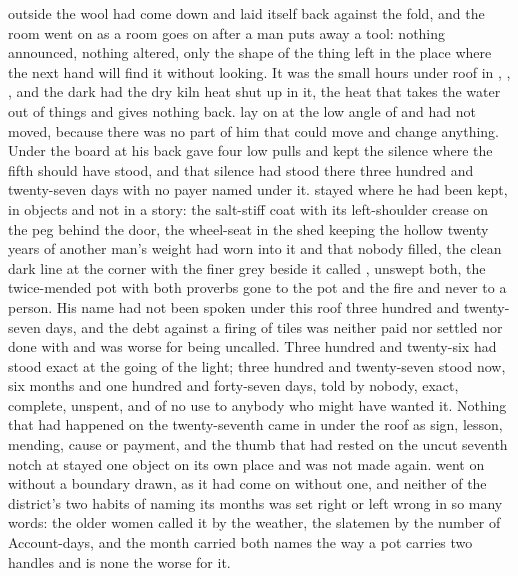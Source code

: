 
 outside the wool had come down and laid itself back against the fold, and the room went on as a room goes on after a man puts away a tool: nothing announced, nothing altered, only the shape of the thing left in the place where the next hand will find it without looking. It was the small hours under  roof in , , , and the dark had the dry kiln heat shut up in it, the heat that takes the water out of things and gives nothing back.  lay on  at the low angle of  and had not moved, because there was no part of him that could move and change anything. Under the board at his back  gave four low pulls and kept the silence where the fifth should have stood, and that silence had stood there three hundred and twenty-seven days with no payer named under it.  stayed where he had been kept, in objects and not in a story: the salt-stiff coat with its left-shoulder crease on the peg behind the door, the wheel-seat in the shed keeping the hollow twenty years of another man's weight had worn into it and that nobody filled, the clean dark line at the corner with the finer grey beside it called , unswept both, the twice-mended pot with both proverbs gone to the pot and the fire and never to a person. His name had not been spoken under this roof three hundred and twenty-seven days, and the debt against a firing of tiles was neither paid nor settled nor done with and was worse for being uncalled. Three hundred and twenty-six had stood exact at the going of the light; three hundred and twenty-seven stood now, six months and one hundred and forty-seven days, told by nobody, exact, complete, unspent, and of no use to anybody who might have wanted it. Nothing that had happened on the twenty-seventh came in under the roof as sign, lesson, mending, cause or payment, and the thumb that had rested on the uncut seventh notch at  stayed one object on its own place and was not made again.  went on without a boundary drawn, as it had come on without one, and neither of the district's two habits of naming its months was set right or left wrong in so many words: the older women called it by the weather, the slatemen by the number of Account-days, and the month carried both names the way a pot carries two handles and is none the worse for it.

